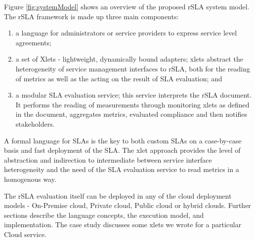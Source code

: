 Figure \ref{fig:systemModel} shows an overview of the proposed rSLA system model. The rSLA framework is made up three main components:
\begin{enumerate}
\item a language for administrators or service providers to express service level agreements; 
\item a set of  Xlets - lightweight, dynamically bound adapters; xlets abstract the heterogeneity of service management interfaces to rSLA, both for the reading of metrics as well as the acting on the result of SLA evaluation; and
\item a modular SLA evaluation service; this service interprets the rSLA document. It performs the reading of measurements through monitoring xlets as defined in the document, aggregates metrics, evaluated compliance and then notifies stakeholders.
\end{enumerate}

A formal language for SLAs is the key to both custom SLAs on a case-by-case basis and fast deployment of the SLA. The xlet approach provides the level of abstraction and indirection to intermediate between service interface heterogeneity and the need of the SLA evaluation service to read metrics in a homogenous way. 

The rSLA evaluation itself can be deployed in any 
of the cloud deployment models - On-Premise cloud, Private cloud, Public cloud or hybrid clouds. Further sections describe the language concepts, the execution model, and implementation. The case study discusses some xlets we wrote for a particular Cloud service.



